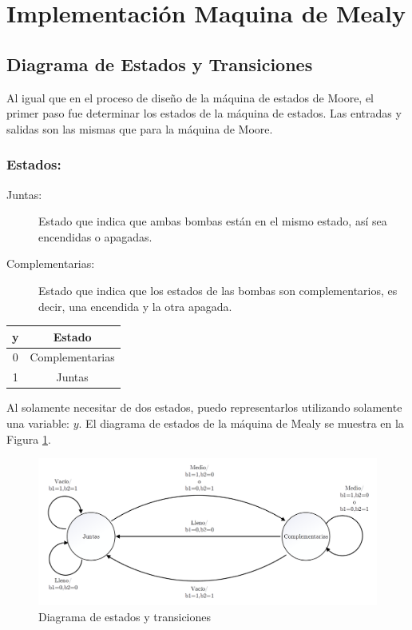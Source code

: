 \documentclass[10pt,a4paper]{article}
\begin{document}
\section*{Implementación Maquina de Mealy}
\subsection*{Diagrama de Estados y Transiciones}
Al igual que en el proceso de diseño de la máquina de estados de Moore, el primer paso fue determinar los estados de la máquina de estados. Las entradas y salidas son las mismas que para la máquina de Moore.

\subsubsection*{Estados:}

\begin{description}
\item[Juntas:] Estado que indica que ambas bombas están en el mismo estado, así sea encendidas o apagadas.
\item[Complementarias:] Estado que indica que los estados de las bombas son complementarios, es decir, una encendida y la otra apagada.
\end{description}

\begin{table}[H]
	\centering
	\begin{tabular}{c|c}
	y & Estado \\ 
	\hline 
	0 & Complementarias \\
	1 & Juntas \\ 
	\end{tabular} 
\end{table}

Al solamente necesitar de dos estados, puedo representarlos utilizando solamente una variable: $y$. El diagrama de estados de la máquina de Mealy se muestra en la Figura \ref{1_fig_estados_mealy}.


\begin{figure}[H]
\centering
\includegraphics[scale=0.4]{images/diagrama_estados_mealy.png}
\caption{Diagrama de estados y transiciones} \label{1_fig_estados_mealy}
\end{figure}
\end{document}
